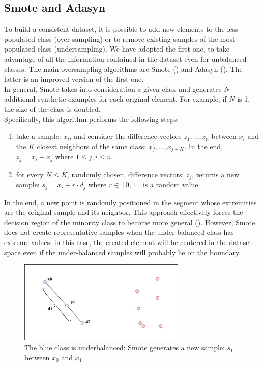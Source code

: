 \documentclass[LaM,binding=0.6cm]{sapthesis}
\begin{document}
\subsection{Smote and Adasyn}
To build a consistent dataset, it is possible to add new elements to the less populated class (over-sampling) or to remove existing samples of the most populated class (undersampling). We have adopted the first one, 
to take advantage of all the information contained in the dataset even for unbalanced classes. The main oversampling algorithms are Smote (\cite{smotepaper}) and Adasyn (\cite{conf/ijcnn/HeBGL08}). The latter is an improved version of the first one. \\In general, Smote takes into consideration a given class and generates $N$ additional synthetic examples for each original element. For example, if $N$ is 1, the size of the class is doubled.\\Specifically, this algorithm performs the following steps:
\begin{enumerate}
\item take a sample: $x_i$, and consider the difference vectors $z_1,\dots,z_n$ between $x_i$ and the $K$ closest neighbors of the same class: ${x_j,\dots,x_{j+K}}$. In the end, $z_j = x_i - x_j$  where $1\leq j,i\leq n$
\item for every $N\leq K$, randomly chosen, difference vectors: $z_j$, returns a new sample: $s_j = x_i+r\cdot d_j$ where $r \in [0,1]$ is a random value.
\end{enumerate}
In the end, a new point is randomly positioned in the segment whose extremities are the original sample and its neighbor. This approach effectively forces the decision region of the minority class to become more general (\cite{smotepaper}). However, Smote does not create representative samples when the under-balanced class has extreme values: in this case, the created element will be centered in the dataset space even if the under-balanced samples will probably lie on the boundary.
\begin{figure}[H]  \centering
    \includegraphics[width=80mm,scale=0.7]{smoteex.png}
    \caption{The blue class is underbalanced: Smote generates a new sample: $s_1$ between $x_0$ and $x_1$}
    \label{fig:smoteex}
\end{figure}
\end{document}
